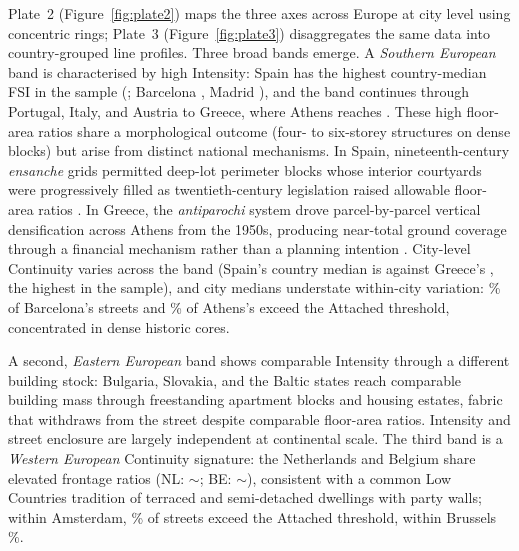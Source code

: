\documentclass[review,authoryear]{elsarticle}
\begin{document}
Plate~2 (Figure~\ref{fig:plate2}) maps the three axes across Europe at city level using concentric rings; Plate~3 (Figure~\ref{fig:plate3}) disaggregates the same data into country-grouped line profiles. Three broad bands emerge. A \emph{Southern European} band is characterised by high Intensity: Spain has the highest country-median FSI in the sample (\fsiCtryES; Barcelona \fsiBarcelona, Madrid \fsiMadrid), and the band continues through Portugal, Italy, and Austria to Greece, where Athens reaches \fsiAthens. These high floor-area ratios share a morphological outcome (four- to six-storey structures on dense blocks) but arise from distinct national mechanisms. In Spain, nineteenth-century \emph{ensanche} grids permitted deep-lot perimeter blocks whose interior courtyards were progressively filled as twentieth-century legislation raised allowable floor-area ratios \citep{busquets2005barcelona}. In Greece, the \emph{antiparochi} system drove parcel-by-parcel vertical densification across Athens from the 1950s, producing near-total ground coverage through a financial mechanism rather than a planning intention \citep{maloutas2003promoting}. City-level Continuity varies across the band (Spain's country median is \contCtryES{} against Greece's \contCtryEL{}, the highest in the sample), and city medians understate within-city variation: \pctContBarcelona\% of Barcelona's streets and \pctContAthens\% of Athens's exceed the Attached threshold, concentrated in dense historic cores.

A second, \emph{Eastern European} band shows comparable Intensity through a different building stock: Bulgaria, Slovakia, and the Baltic states reach comparable building mass through freestanding apartment blocks and housing estates, fabric that withdraws from the street despite comparable floor-area ratios. Intensity and street enclosure are largely independent at continental scale. The third band is a \emph{Western European} Continuity signature: the Netherlands and Belgium share elevated frontage ratios (NL: $\sim$\contNLmed; BE: $\sim$\contBEmed), consistent with a common Low Countries tradition of terraced and semi-detached dwellings with party walls; within Amsterdam, \pctContAmsterdam\% of streets exceed the Attached threshold, within Brussels \pctContBrussels\%.
\end{document}
